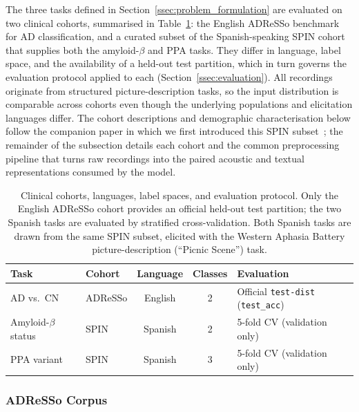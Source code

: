 \documentclass[a4paper,12pt]{article}
\begin{document}
The three tasks defined in Section~\ref{ssec:problem_formulation} are evaluated on two clinical cohorts, summarised in Table~\ref{tab:datasets}: the English ADReSSo benchmark for AD classification, and a curated subset of the Spanish-speaking SPIN cohort that supplies both the amyloid-$\beta$ and PPA tasks. They differ in language, label space, and the availability of a held-out test partition, which in turn governs the evaluation protocol applied to each (Section~\ref{ssec:evaluation}). All recordings originate from structured picture-description tasks, so the input distribution is comparable across cohorts even though the underlying populations and elicitation languages differ. The cohort descriptions and demographic characterisation below follow the companion paper in which we first introduced this SPIN subset~\cite{esteve2025speechadppa}; the remainder of the subsection details each cohort and the common preprocessing pipeline that turns raw recordings into the paired acoustic and textual representations consumed by the model.

\begin{table}[H]
\centering
\caption[Clinical cohorts and evaluation protocol]{\footnotesize Clinical cohorts, languages, label spaces, and evaluation protocol. Only the English ADReSSo cohort provides an official held-out test partition; the two Spanish tasks are evaluated by stratified cross-validation. Both Spanish tasks are drawn from the same SPIN subset, elicited with the Western Aphasia Battery picture-description (``Picnic Scene'') task.}
\label{tab:datasets}
\footnotesize{
\begin{tabular}{@{}llccl@{}}
\toprule
\textbf{Task} & \textbf{Cohort} & \textbf{Language} & \textbf{Classes} & \textbf{Evaluation} \\ \midrule
AD vs.\ CN & ADReSSo & English & 2 & Official \texttt{test-dist} (\texttt{test\_acc}) \\
Amyloid-$\beta$ status & SPIN & Spanish & 2 & 5-fold CV (validation only) \\
PPA variant & SPIN & Spanish & 3 & 5-fold CV (validation only) \\
\bottomrule
\end{tabular}
}
\end{table}

\subsubsection{ADReSSo Corpus}
\end{document}
